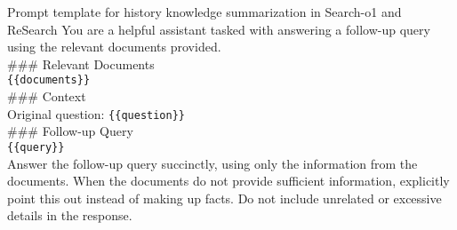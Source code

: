 \begin{figure*}[h]
\begin{AIbox}{Prompt template for history knowledge summarization in Search-o1 and ReSearch}
You are a helpful assistant tasked with answering a follow-up query using the relevant documents provided.\\

\#\#\# Relevant Documents\\
\verb|{{documents}}|\\

\#\#\# Context\\
Original question: \verb|{{question}}|\\

\#\#\# Follow-up Query\\
\verb|{{query}}|\\

Answer the follow-up query succinctly, using only the information from the documents. When the documents do not provide sufficient information, explicitly point this out instead of making up facts. Do not include unrelated or excessive details in the response.
\end{AIbox}
\caption{Template used for history knowledge summarization in Search-o1 and ReSearch.}
\label{fig:prompt_summarize}
\end{figure*}


